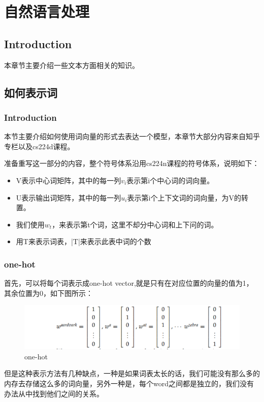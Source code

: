 \chapter{自然语言处理}

\section*{Introduction}
	本章节主要介绍一些文本方面相关的知识。
	
\section{如何表示词}
	\subsection*{Introduction}
	本节主要介绍如何使用词向量的形式去表达一个模型，本章节大部分内容来自知乎专栏以及cs224d课程。
	
	准备重写这一部分的内容，整个符号体系沿用cs224n课程的符号体系，说明如下：
	
	\begin{itemize}
		\item V表示中心词矩阵，其中的每一列$v_i$表示第i个中心词的词向量。
		\item U表示输出词矩阵，其中的每一列$u_i$表示第i个上下文词的词向量，为V的转置。
		\item 我们使用$w_t$，来表示第t个词，这里不却分中心词和上下问的词。
		\item 用T来表示词表，|T|来表示此表中词的个数
	\end{itemize}
	
	\subsection{one-hot}
	首先，可以将每个词表示成one-hot vector,就是只有在对应位置的向量的值为1，其余位置为0，如下图所示：
	

	\begin{figure}[htbp]
	\centering\includegraphics[width=6in]{img/6-1.png}
	\caption{one-hot}\label{fig:6-1}
	\end{figure}
	
	但是这种表示方法有几种缺点，一种是如果词表太长的话，我们可能没有那么多的内存去存储这么多的词向量，另外一种是，每个word之间都是独立的，我们没有办法从中找到他们之间的关系。
	
